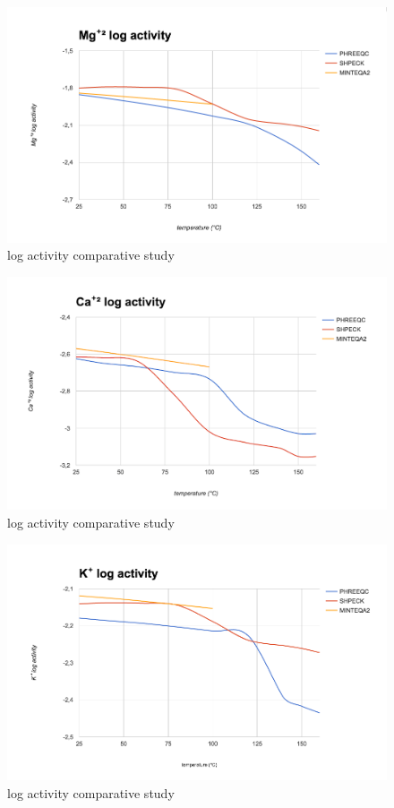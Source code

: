 \begin{figure}[ht!]
\centering
\includegraphics[width=140mm]{figures/mg+2.png}
\caption{ log activity comparative study}
\label{fig:mg+2}
\end{figure}

\begin{figure}[ht!]
\centering
\includegraphics[width=140mm]{figures/ca+2.png}
\caption{ log activity comparative study}
\label{fig:ca+2}
\end{figure}

\begin{figure}[ht!]
\centering
\includegraphics[width=140mm]{figures/k+.png}
\caption{ log activity comparative study}
\label{fig:k+}
\end{figure}

